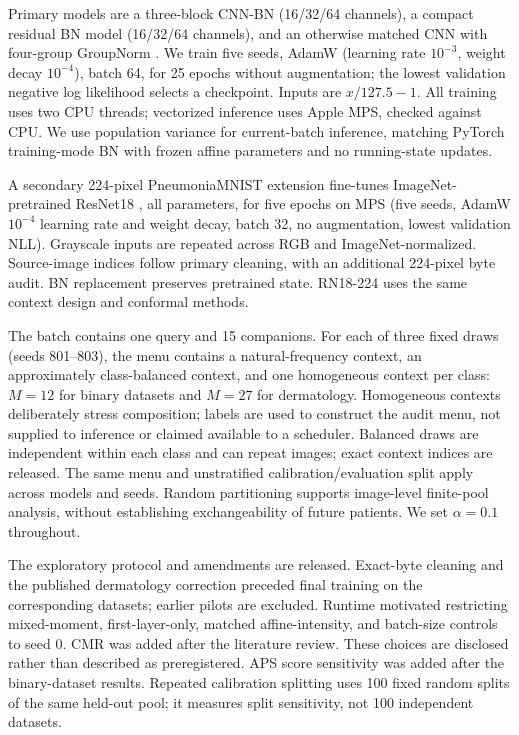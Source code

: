 \documentclass{article}
\begin{document}
Primary models are a three-block CNN-BN (16/32/64 channels), a compact residual BN model (16/32/64 channels), and an otherwise matched CNN with four-group GroupNorm \cite{gn}. We train five seeds, AdamW (learning rate $10^{-3}$, weight decay $10^{-4}$), batch 64, for 25 epochs without augmentation; the lowest validation negative log likelihood selects a checkpoint. Inputs are $x/127.5-1$. All training uses two CPU threads; vectorized inference uses Apple MPS, checked against CPU. We use population variance for current-batch inference, matching PyTorch training-mode BN with frozen affine parameters and no running-state updates.

A secondary 224-pixel PneumoniaMNIST extension fine-tunes ImageNet-pretrained ResNet18 \cite{resnet}, all parameters, for five epochs on MPS (five seeds, AdamW $10^{-4}$ learning rate and weight decay, batch 32, no augmentation, lowest validation NLL). Grayscale inputs are repeated across RGB and ImageNet-normalized. Source-image indices follow primary cleaning, with an additional 224-pixel byte audit. BN replacement preserves pretrained state. RN18-224 uses the same context design and conformal methods.

The batch contains one query and 15 companions. For each of three fixed draws (seeds 801--803), the menu contains a natural-frequency context, an approximately class-balanced context, and one homogeneous context per class: $M=12$ for binary datasets and $M=27$ for dermatology. Homogeneous contexts deliberately stress composition; labels are used to construct the audit menu, not supplied to inference or claimed available to a scheduler. Balanced draws are independent within each class and can repeat images; exact context indices are released. The same menu and unstratified calibration/evaluation split apply across models and seeds. Random partitioning supports image-level finite-pool analysis, without establishing exchangeability of future patients. We set $\alpha=0.1$ throughout.

The exploratory protocol and amendments are released. Exact-byte cleaning and the published dermatology correction preceded final training on the corresponding datasets; earlier pilots are excluded. Runtime motivated restricting mixed-moment, first-layer-only, matched affine-intensity, and batch-size controls to seed 0. CMR was added after the literature review. These choices are disclosed rather than described as preregistered. APS score sensitivity was added after the binary-dataset results. Repeated calibration splitting uses 100 fixed random splits of the same held-out pool; it measures split sensitivity, not 100 independent datasets.
\end{document}
